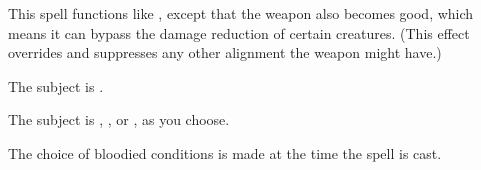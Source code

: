 \begin{spelleffect}
  This spell functions like , except that the weapon also becomes good, which means it can bypass the damage reduction of certain creatures. (This effect overrides and suppresses any other alignment the weapon might have.)
\end{spelleffect}

\begin{spellhealthy}
  The subject is \sickened.
\end{spellhealthy}
\begin{spellblood}
  The subject is \blinded, \deafened, or \sickened, as you choose.
\end{spellblood}
\begin{spellnotes}
   The choice of bloodied conditions is made at the time the spell is cast.
\end{spellnotes}

